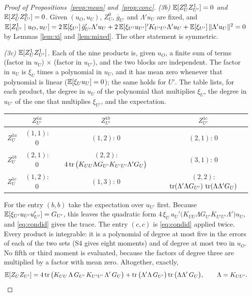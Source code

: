 \begin{proof}[Proof of Propositions~\ref{prop:mean} and~\ref{prop:conc}]
\emph{(3b) $\mathbb{E}[Z_U^0Z_{U'}^1]=0$ and $\mathbb{E}[Z_U^1Z_{U'}^0]=0$.} Given $(u_O,u_U)$, $Z_U^0$, $\bar g_{U'}$
and $\Lambda'u_U$ are fixed, and
$\mathbb{E}[Z_{U'}^1\mid u_O,u_U]=2\,\mathbb{E}[\xi_{U'}]\,\bar g_{U'}'\Lambda'u_U+2\,\mathbb{E}[\xi_{U'}u_{U'}]'K_{U'U'}\Lambda'u_U
+\mathbb{E}[\xi_{U'}]\,\|\Lambda'u_U\|^2=0$ by Lemmas \ref{lem:xi} and \ref{lem:mixed}. The other statement is symmetric.

\emph{(3c) $\mathbb{E}[Z_U^1Z_{U'}^1]$.} Each of the nine products is, given $u_O$, a finite sum of terms
(factor in $u_U$)$\,\times\,$(factor in $u_{U'}$), and the two blocks are independent. The factor in
$u_U$ is $\xi_U$ times a polynomial in $u_U$, and it has mean zero whenever that polynomial is linear
($\mathbb{E}[\xi_Uu_U]=0$); the same holds for $U'$. The table lists, for each product, the degree in $u_U$ of the polynomial that multiplies $\xi_U$,
the degree in $u_{U'}$ of the one that multiplies $\xi_{U'}$, and the expectation.
\begin{center}\small
\renewcommand{\arraystretch}{1.25}
\begin{tabular}{@{}l|ccc@{}}
 & $Z_{U'}^{1a}$ & $Z_{U'}^{1b}$ & $Z_{U'}^{1c}$ \\
\hline
$Z_U^{1a}$ & $(1,1)$: $0$ & $(1,2)$: $0$ & $(2,1)$: $0$ \\
$Z_U^{1b}$ & $(2,1)$: $0$ & $(2,2)$: $4\operatorname{tr}\big(K_{UU}\Lambda G_{U'}K_{U'U'}\Lambda'G_U\big)$ & $(3,1)$: $0$ \\
$Z_U^{1c}$ & $(1,2)$: $0$ & $(1,3)$: $0$ & $(2,2)$: $\operatorname{tr}(\Lambda'\Lambda G_{U'})\,\operatorname{tr}(\Lambda\Lambda'G_U)$ \\
\end{tabular}
\end{center}
For the entry $(b,b)$ take the expectation over $u_{U'}$ first. Because
$\mathbb{E}[\xi_{U'}u_{U'}u_{U'}']=G_{U'}$, this leaves the quadratic form
$4\,\xi_U\,u_U'\big(K_{UU}\Lambda G_{U'}K_{U'U'}\Lambda'\big)u_U$, and \eqref{eq:condid} gives the trace. The
entry $(c,c)$ is \eqref{eq:condid} applied twice. Every
product is integrable: it is a polynomial of degree at most five in the errors of each of the two
sets (S4 gives eight moments) and of degree at most two in $u_O$. No fifth or third moment is
evaluated, because the factors of degree three are multiplied by a factor with mean zero.
Altogether, exactly,
\begin{equation}\label{eq:cross}
\mathbb{E}[Z_UZ_{U'}]=4\operatorname{tr}\big(K_{UU}\,\Lambda\,G_{U'}\,K_{U'U'}\,\Lambda'\,G_U\big)+\operatorname{tr}\big(\Lambda'\Lambda\,G_{U'}\big)\operatorname{tr}\big(\Lambda\Lambda'\,G_U\big),
\qquad \Lambda=K_{UU'} .
\end{equation}

\end{proof}
